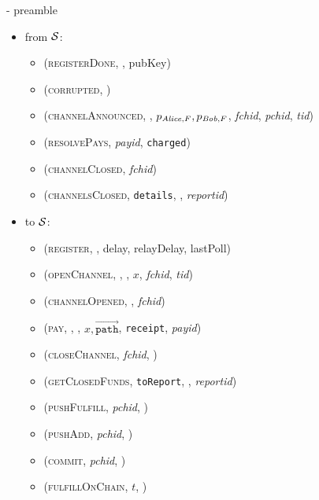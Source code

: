 \begin{figure}[H]
\begin{systembox}{\fpaynet - preamble}
\begin{itemize}
\begin{itemize}
        \end{itemize}
        \item from $\mathcal{S}$:
        \begin{itemize}
          \item (\textsc{registerDone}, \alice, pubKey)
          \item (\textsc{corrupted}, \alice)
          \item (\textsc{channelAnnounced}, \alice, $p_{\mathit{Alice}, F}, p_{\mathit{Bob},
          F}$, \textit{fchid}, \textit{pchid}, \textit{tid})
          \item (\textsc{resolvePays}, \textit{payid}, \texttt{charged})
          \item (\textsc{channelClosed}, \textit{fchid})
          \item (\textsc{channelsClosed}, \texttt{details}, \alice,
          \textit{reportid})
        \end{itemize}
        \item to $\mathcal{S}$:
        \begin{itemize}
          \item (\textsc{register}, \alice, delay, relayDelay, lastPoll)
          \item (\textsc{openChannel}, \alice, \bob, $x$, \textit{fchid},
          \textit{tid})
          \item (\textsc{channelOpened}, \alice, \textit{fchid})
          \item (\textsc{pay}, \alice, \bob, $x,
          \overrightarrow{\mathtt{path}}$, \texttt{receipt}, \textit{payid})
          \item (\textsc{closeChannel}, \textit{fchid}, \alice)
          \item (\textsc{getClosedFunds}, \texttt{toReport}, \alice,
          \textit{reportid})
          \item (\textsc{pushFulfill}, \textit{pchid}, \alice)
          \item (\textsc{pushAdd}, \textit{pchid}, \alice)
          \item (\textsc{commit}, \textit{pchid}, \alice)
          \item (\textsc{fulfillOnChain}, $t$, \alice)
        \end{itemize}
      \end{itemize}
    \end{systembox}
  \end{figure}

